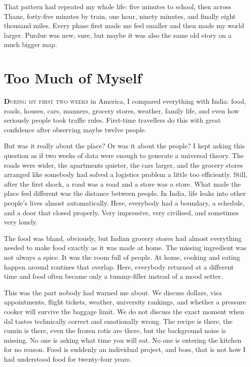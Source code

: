 \documentclass[11pt,twoside,openany]{book}
\newcommand{\dropcap}[2]{\lettrine[lines=3,findent=2pt,nindent=4pt]{\color{accent}\textsf{\textbf{#1}}}{#2}}
\begin{document}
That pattern had repeated my whole life: five minutes to school, then across
Thane, forty-five minutes by train, one hour, ninety minutes, and finally
eight thousand miles. Every phase first made me feel smaller and then made my
world larger. Purdue was new, sure, but maybe it was also the same old story
on a much bigger map.

\chapter{Too Much of Myself}

\dropcap{D}{uring my first two weeks} in America, I compared everything with
India: food, roads, houses, cars, manners, grocery stores, weather, family
life, and even how seriously people took traffic rules. First-time travellers
do this with great confidence after observing maybe twelve people.

But was it really about the place? Or was it about the people? I kept asking
this question as if two weeks of data were enough to generate a universal
theory. The roads were wider, the apartments quieter, the cars larger, and
the grocery stores arranged like somebody had solved a logistics problem a
little too efficiently. Still, after the first shock, a road was a road and a
store was a store. What made the place feel different was the distance between
people. In India, life leaks into other people's lives almost automatically.
Here, everybody had a boundary, a schedule, and a door that closed properly.
Very impressive, very civilised, and sometimes very lonely.

The food was bland, obviously, but Indian grocery stores had almost everything
needed to make food exactly as it was made at home. The missing ingredient was
not always a spice. It was the room full of people. At home, cooking and
eating happen around routines that overlap. Here, everybody returned at a
different time and food often became only a tummy-filler instead of a mood
setter.

This was the part nobody had warned me about. We discuss dollars, visa
appointments, flight tickets, weather, university rankings, and whether a
pressure cooker will survive the baggage limit. We do not discuss the exact
moment when dal tastes technically correct and emotionally wrong. The recipe
is there, the cumin is there, even the frozen rotis are there, but the
background noise is missing. No one is asking what time you will eat. No one
is entering the kitchen for no reason. Food is suddenly an individual
project, and boss, that is not how I had understood food for twenty-four
years.
\end{document}
